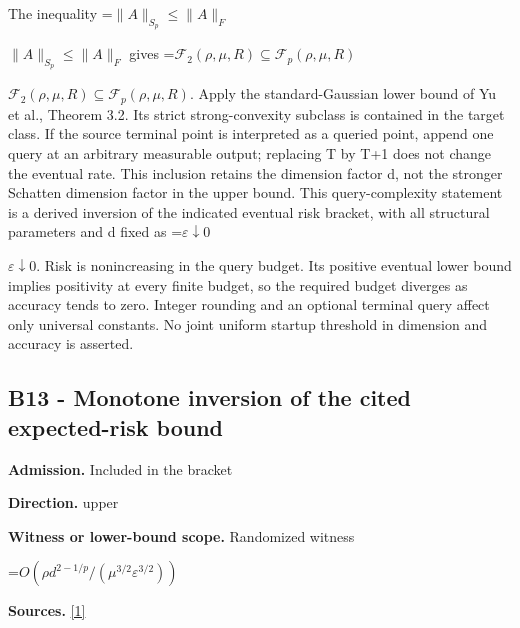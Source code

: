 \documentclass[10pt,a4paper]{article}
\newcommand{\AtlasMath}[1]{\par\begingroup\centering\setbox0=\hbox{$\displaystyle #1$}\ifdim\wd0>1.4\linewidth\typeout{ATLAS WIDE FORMULA: \the\wd0}\fi\ifdim\wd0>\linewidth\resizebox{\linewidth}{!}{\box0}\else\box0\fi\par\endgroup}
\newcommand{\AtlasInlineMath}[1]{\begingroup\setbox0=\hbox{$#1$}\ifdim\wd0>.4\linewidth\endgroup\AtlasMath{#1}\else\endgroup$#1$\fi}
\begin{document}
The inequality \AtlasInlineMath{\|A\|_{S_p}\le\|A\|_F} gives \AtlasInlineMath{\mathcal F_2(\rho,\mu,R)\subseteq\mathcal F_p(\rho,\mu,R)}. Apply the standard-Gaussian lower bound of Yu et al., Theorem 3.2. Its strict strong-convexity subclass is contained in the target class. If the source terminal point is interpreted as a queried point, append one query at an arbitrary measurable output; replacing T by T+1 does not change the eventual rate. This inclusion retains the dimension factor d, not the stronger Schatten dimension factor in the upper bound. This query-complexity statement is a derived inversion of the indicated eventual risk bracket, with all structural parameters and d fixed as \AtlasInlineMath{\varepsilon\downarrow0}. Risk is nonincreasing in the query budget. Its positive eventual lower bound implies positivity at every finite budget, so the required budget diverges as accuracy tends to zero. Integer rounding and an optional terminal query affect only universal constants. No joint uniform startup threshold in dimension and accuracy is asserted.



\subsection{B13 - Monotone inversion of the cited expected-risk bound}


\textbf{Admission.} Included in the bracket



\textbf{Direction.} upper



\textbf{Witness or lower-bound scope.} Randomized witness



\AtlasMath{O(\rho d^{2-1/p}/(\mu^{3/2}\varepsilon^{3/2}))}


\textbf{Sources.} \href{https://papers.nips.cc/paper_files/paper/2024/file/b444ad72520a5f5c467343be88e352ed-Paper-Conference.pdf}{[1]}
\end{document}
